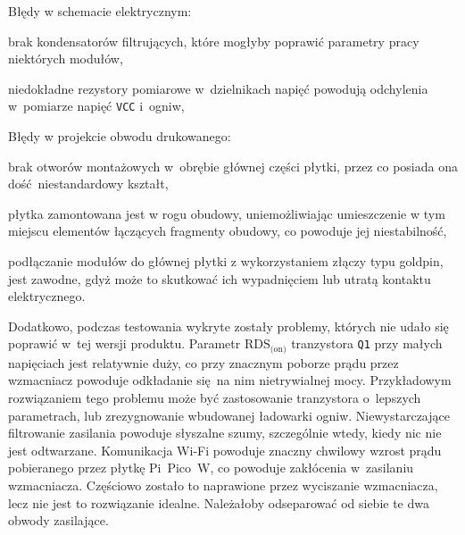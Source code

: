 \documentclass[polish]{aghengthesis}
\let\tempone\itemize
\let\temptwo\enditemize
\renewenvironment{itemize}{\tempone\setlength{\itemsep}{0cm}}{\temptwo}
\begin{document}
				\begin{itemize}
					\setlength{\itemsep}{0.5cm}
					\item Błędy w schemacie elektrycznym:
					\begin{itemize}
						\setlength{\itemsep}{0.2cm}
						\item brak kondensatorów filtrujących, które mogłyby poprawić parametry pracy niektórych modułów,
						\item niedokładne rezystory pomiarowe w~dzielnikach napięć powodują odchylenia w~pomiarze napięć \lstinline|VCC| i~ogniw,
					\end{itemize}

					\item Błędy w projekcie obwodu drukowanego:
					\begin{itemize}
						\setlength{\itemsep}{0.2cm}
						\item brak otworów montażowych w~obrębie głównej części płytki, przez co posiada ona dość niestandardowy kształt,
						\item płytka zamontowana jest w rogu obudowy, uniemożliwiając umieszczenie w tym miejscu elementów łączących fragmenty obudowy, co powoduje jej niestabilność,
						\item podłączanie modułów do głównej płytki z wykorzystaniem złączy typu goldpin, jest zawodne, gdyż może to skutkować ich wypadnięciem lub utratą kontaktu elektrycznego.
					\end{itemize}
				\end{itemize}
				
				Dodatkowo, podczas testowania wykryte zostały problemy, których nie udało się poprawić w~tej wersji produktu.
				Parametr $\text{RDS}_{\text{(on)}}$ tranzystora \lstinline|Q1| przy małych napięciach jest relatywnie duży, co przy znacznym poborze prądu przez wzmacniacz powoduje odkładanie się na nim nietrywialnej mocy. Przykładowym rozwiązaniem tego problemu może być zastosowanie tranzystora o~lepszych parametrach, lub zrezygnowanie wbudowanej ładowarki ogniw.
				Niewystarczające filtrowanie zasilania powoduje słyszalne szumy, szczególnie wtedy, kiedy nic nie jest odtwarzane. Komunikacja Wi-Fi powoduje znaczny chwilowy wzrost prądu pobieranego przez płytkę Pi~Pico~W, co powoduje zakłócenia w~zasilaniu wzmacniacza. Częściowo zostało to naprawione przez wyciszanie wzmacniacza, lecz nie jest to rozwiązanie idealne. Należałoby odseparować od siebie te dwa obwody zasilające.
				$ $\\
				
\end{document}
